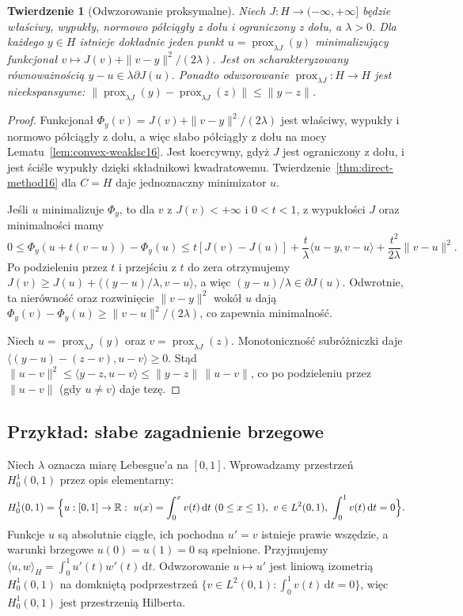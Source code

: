 \documentclass[11pt,a4paper]{article}
\numberwithin{equation}{section}
\theoremstyle{plain}
\newtheorem{twierdzenie}{Twierdzenie}[section]
\theoremstyle{definition}
\theoremstyle{remark}
\newcommand{\R}{\mathbb R}
\begin{document}
\begin{twierdzenie}[Odwzorowanie proksymalne]
\label{thm:prox16}
Niech $J:H\to(-\infty,+\infty]$ będzie właściwy,
wypukły, normowo półciągły z dołu i ograniczony z dołu,
a $\lambda>0$. Dla każdego $y\in H$ istnieje dokładnie
jeden punkt $u=\operatorname{prox}_{\lambda J}(y)$
minimalizujący funkcjonał
$v\mapsto J(v)+\|v-y\|^2/(2\lambda)$.
Jest on scharakteryzowany równoważnością
$y-u\in\lambda\partial J(u)$.
Ponadto odwzorowanie
$\operatorname{prox}_{\lambda J}:H\to H$ jest
nieekspansywne:
$\|\operatorname{prox}_{\lambda J}(y)-
\operatorname{prox}_{\lambda J}(z)\|\le\|y-z\|$.
\end{twierdzenie}
\begin{proof}
Funkcjonał $\Phi_y(v)=J(v)+\|v-y\|^2/(2\lambda)$
jest właściwy, wypukły i normowo półciągły z dołu,
a więc słabo półciągły z dołu na mocy
Lematu~\ref{lem:convex-weaklsc16}.
Jest koercywny, gdyż $J$ jest ograniczony z dołu,
i jest ściśle wypukły dzięki składnikowi kwadratowemu.
Twierdzenie~\ref{thm:direct-method16} dla $C=H$
daje jednoznaczny minimizator $u$.

Jeśli $u$ minimalizuje $\Phi_y$, to dla $v$ z
$J(v)<+\infty$ i $0<t<1$, z wypukłości $J$
oraz minimalności mamy
\[
0\le\Phi_y(u+t(v-u))-\Phi_y(u)
\le t[J(v)-J(u)]+\frac t\lambda\langle u-y,v-u\rangle
+\frac{t^2}{2\lambda}\|v-u\|^2.
\]
Po podzieleniu przez $t$ i przejściu z $t$ do zera
otrzymujemy $J(v)\ge J(u)+\langle(y-u)/\lambda,v-u\rangle$,
a więc $(y-u)/\lambda\in\partial J(u)$.
Odwrotnie, ta nierówność oraz rozwinięcie
$\|v-y\|^2$ wokół $u$ dają
$\Phi_y(v)-\Phi_y(u)\ge\|v-u\|^2/(2\lambda)$,
co zapewnia minimalność.

Niech $u=\operatorname{prox}_{\lambda J}(y)$ oraz
$v=\operatorname{prox}_{\lambda J}(z)$.
Monotoniczność subróżniczki daje
$\langle (y-u)-(z-v),u-v\rangle\ge0$.
Stąd $\|u-v\|^2\le\langle y-z,u-v\rangle
\le\|y-z\|\,\|u-v\|$,
co po podzieleniu przez $\|u-v\|$ (gdy $u\ne v$)
daje tezę.
\end{proof}

\subsection{Przykład: słabe zagadnienie brzegowe}

Niech $\lambda$ oznacza miarę Lebesgue'a na $[0,1]$.
Wprowadzamy przestrzeń $H_0^1(0,1)$ przez opis elementarny:
\[
H_0^1(0,1)=\Bigl\{u:[0,1]\to\R:\ 
 u(x)=\int_0^x v(t)\,\mathrm dt\ (0\le x\le1),\ 
 v\in L^2(0,1),\ \int_0^1 v(t)\,\mathrm dt=0\Bigr\}.
\]
Funkcje $u$ są absolutnie ciągłe, ich pochodna $u'=v$
istnieje prawie wszędzie, a warunki brzegowe
$u(0)=u(1)=0$ są spełnione. Przyjmujemy
$\langle u,w\rangle_H=\int_0^1u'(t)w'(t)\,\mathrm dt$.
Odwzorowanie $u\mapsto u'$ jest liniową izometrią
$H_0^1(0,1)$ na domkniętą podprzestrzeń
$\{v\in L^2(0,1):\int_0^1v(t)\,\mathrm dt=0\}$,
więc $H_0^1(0,1)$ jest przestrzenią Hilberta.
\end{document}
